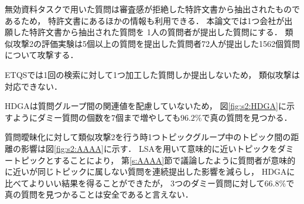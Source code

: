 \documentclass[master]{suribt}
\theoremstyle{definition}
\begin{document}
 無効資料タスクで用いた質問は審査感が拒絶した特許文書から抽出されたものであるため，
 特許文書にあるほかの情報も利用できる．
 本論文では1つ会社が出願した特許文書から抽出された質問を
 1人の質問者が提出した質問にする．
 類似攻撃2の評価実験は5個以上の質問を提出した質問者72人が提出した1562個質問について攻撃する．


 ETQSでは1回の検索に対して1つ加工した質問しか提出しないため，
 類似攻撃は対応できない．

 HDGAは質問グループ間の関連値を配慮していないため，
 図\ref{fig:s2:HDGA}に示すようにダミー質問の個数を7個まで増やしても$96.2\%$で真の質問を見つかる．

 質問曖昧化に対して類似攻撃2を行う時1つトピックグループ中のトピック間の距離の影響は図\ref{fig:s2:AAAA}に示す．
 LSAを用いて意味的に近いトピックをダミートピックとすることにより，
 第\ref{s:AAAA}節で議論したように質問者が意味的に近いが同じトピックに属しない質問を連続提出した影響を減らし，
 HDGAに比べてよりいい結果を得ることができたが，
 3つのダミー質問に対して$66.8\%$で真の質問を見つかることは安全であると言えない．
\end{document}
